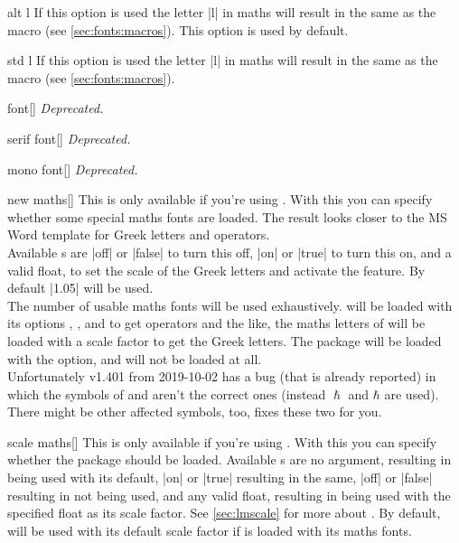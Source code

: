 \begin{describeopt}{alt l}
  If this option is used the letter |l| in maths will result in the same as the
   macro (see \autoref{sec:fonts:macros}). This option is used by
  default.
\end{describeopt}
\begin{describeopt}{std l}
  If this option is used the letter |l| in maths will result in the same as the
   macro (see \autoref{sec:fonts:macros}).
\end{describeopt}
\begin{describeopt}{font}[]
  \emph{Deprecated.}
\end{describeopt}
\begin{describeopt}{serif font}[]
  \emph{Deprecated.}
\end{describeopt}
\begin{describeopt}{mono font}[]
  \emph{Deprecated.}
\end{describeopt}
\begin{describeopt}{new maths}[]
  This is only available if you're using . With this you can
  specify whether some special maths fonts are loaded. The result looks closer
  to the MS Word template for Greek letters and operators.\\
  Available s are |off| or |false| to turn this off, |on| or |true|
  to turn this on, and a valid float, to set the scale of the Greek letters and
  activate the feature.  By default |1.05| will be used.\\
  The number of usable maths fonts will be used exhaustively. 
  will be loaded with its options , ,
   and  to get operators and the like, the
  maths letters of  will be loaded with a scale factor to get the
  Greek letters.  The  package will be loaded with the 
  option, and  will not be loaded at all.\\
  Unfortunately  v1.401 from 2019-10-02 has a bug (that is
  already reported) in which the symbols of  and  aren't
  the correct ones (instead $\hslash$ and $\hbar$ are used). There might be
  other affected symbols, too,  fixes these two for you.
\end{describeopt}
\begin{describeopt}{scale maths}[]
  This is only available if you're using . With this you can
  specify whether the  package should be loaded. Available
  s are no argument, resulting in  being used with
  its default, |on| or |true| resulting in the same, |off| or |false| resulting
  in  not being used, and any valid float, resulting in
   being used with the specified float as its scale factor. See
  \autoref{sec:lmscale} for more about . By default,
   will be used with its default scale factor if 
  is loaded with its maths fonts.
\end{describeopt}

